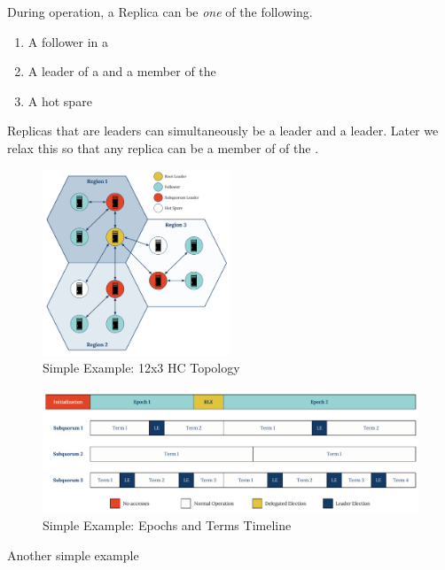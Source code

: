 \documentclass[10pt,twocolumn]{article}
\begin{document}
During operation, a Replica can be \emph{one} of the following.

\begin{enumerate}
    \item A follower in a \sub
    \item A leader of a \sub and a member of the \roo
    \item A hot spare
\end{enumerate}

Replicas that are leaders can simultaneously be a \sub leader and a \roo
leader.
Later we relax this so that any replica can be a member of of the \roo.

\begin{figure}
    \centering
    \includegraphics[width=0.5\textwidth]{figures/simple_example_topology}
    \caption{Simple Example: 12x3 HC Topology}
    \label{fig:simple_example_topology}
\end{figure}

\begin{figure}
    \centering
    \minipage{\textwidth}
    \includegraphics[width=\linewidth]{figures/simple_example_epochs_terms}
    \caption{Simple Example: Epochs and Terms Timeline}
    \label{fig:simple_example_epochs_terms}
    \endminipage
\end{figure}

Another simple example
\end{document}
